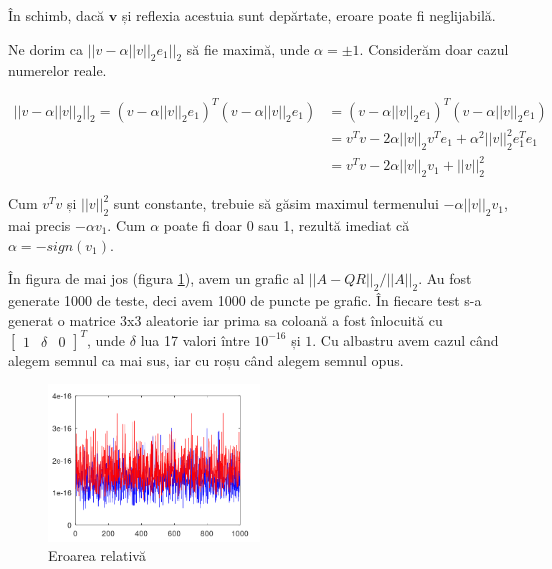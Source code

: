 \documentclass{exam}
\begin{document}
\par În schimb, dacă $\mathbf{v}$ și reflexia acestuia sunt depărtate,
eroare poate fi neglijabilă.

\par Ne dorim ca $||v - \alpha ||v||_2 e_1||_2$ să fie maximă, unde
$\alpha = \pm 1$. Considerăm doar cazul numerelor reale.

\begin{align*}
	||v - \alpha ||v||_2||_2 = (v - \alpha ||v||_2 e_1)^T (v - \alpha ||v||_2 e_1) & = (v - \alpha ||v||_2 e_1)^T(v - \alpha ||v||_2 e_1)           \\
	                                                                               & = v^Tv - 2 \alpha ||v||_2 v^Te_1 + \alpha^2 ||v||_2^2 e_1^Te_1 \\
	                                                                               & = v^Tv - 2 \alpha ||v||_2 v_1 + ||v||_2^2
\end{align*}

\par Cum $v^Tv$ și $||v||_2^2$ sunt constante, trebuie să găsim maximul
termenului $- \alpha ||v||_2 v_1$, mai precis $- \alpha v_1$. Cum $\alpha$ poate fi
doar 0 sau 1, rezultă imediat că $\alpha = -sign(v_1)$.

\newpage
\par În figura de mai jos (figura \ref{fig:5}), avem un grafic al
$||A - QR||_2 / ||A||_2$. Au fost generate 1000 de teste, deci avem 1000 de puncte pe
grafic. În fiecare test s-a generat o matrice 3x3 aleatorie iar prima sa coloană
a fost înlocuită cu $\begin{bmatrix} 1 & \delta & 0 \end{bmatrix}^T$, unde
$\delta$ lua 17 valori între $10^{-16}$ și $1$. Cu albastru avem cazul când
alegem semnul ca mai sus, iar cu roșu când alegem semnul opus.

\begin{figure}[ht]
	\centering
	\includegraphics[width=0.5\textwidth]{hbad}
	\caption{Eroarea relativă}
	\label{fig:5}
\end{figure}
\end{document}
